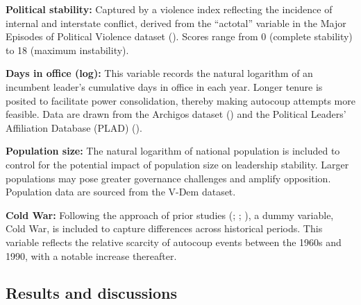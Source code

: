 \documentclass[
  12pt,
]{report}
\begin{document}
\textbf{Political stability:} Captured by a violence index reflecting
the incidence of internal and interstate conflict, derived from the
``actotal'' variable in the Major Episodes of Political Violence dataset
(). Scores
range from 0 (complete stability) to 18 (maximum instability).

\textbf{Days in office (log):} This variable records the natural
logarithm of an incumbent leader's cumulative days in office in each
year. Longer tenure is posited to facilitate power consolidation,
thereby making autocoup attempts more feasible. Data are drawn from the
Archigos dataset () and the Political Leaders' Affiliation Database (PLAD)
().

\textbf{Population size:} The natural logarithm of national population
is included to control for the potential impact of population size on
leadership stability. Larger populations may pose greater governance
challenges and amplify opposition. Population data are sourced from the
V-Dem dataset.

\textbf{Cold War:} Following the approach of prior studies
(;
;
), a dummy variable,
Cold War, is included to capture differences across historical periods.
This variable reflects the relative scarcity of autocoup events between
the 1960s and 1990, with a notable increase thereafter.

\subsection*{Results and discussions}\label{results-and-discussions}
\end{document}
